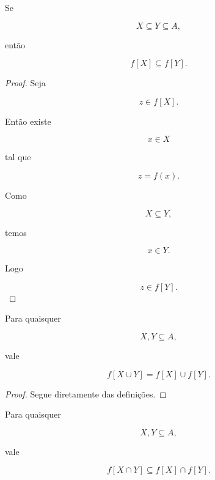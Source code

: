 \documentclass[../../main]{subfiles}
\begin{document}
\begin{prop}
	\label{prop:matematica:funcoes:imagem-direta-e-inversa:monotonicidade-direta}

	Se

	\[
		X\subseteq Y\subseteq A,
	\]

	então

	\[
		f[X]
		\subseteq
		f[Y].
	\]

\end{prop}

\begin{proof}

	Seja

	\[
		z\in f[X].
	\]

	Então existe

	\[
		x\in X
	\]

	tal que

	\[
		z=f(x).
	\]

	Como

	\[
		X\subseteq Y,
	\]

	temos

	\[
		x\in Y.
	\]

	Logo

	\[
		z\in f[Y].
	\]

\end{proof}

\begin{prop}
	\label{prop:matematica:funcoes:imagem-direta-e-inversa:uniao-direta}

	Para quaisquer

	\[
		X,Y\subseteq A,
	\]

	vale

	\[
		f[X\cup Y]
		=
		f[X]
		\cup
		f[Y].
	\]

\end{prop}

\begin{proof}

	Segue diretamente das definições.

\end{proof}

\begin{prop}
	\label{prop:matematica:funcoes:imagem-direta-e-inversa:intersecao-direta}

	Para quaisquer

	\[
		X,Y\subseteq A,
	\]

	vale

	\[
		f[X\cap Y]
		\subseteq
		f[X]\cap f[Y].
	\]

\end{prop}
\end{document}
